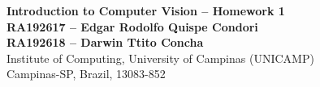 \documentclass[10pt, a4paper]{article}
\begin{document}
\begin{center}

\textbf{Introduction to Computer Vision -- Homework 1} \\[0.1cm]

\textbf{RA192617 -- Edgar Rodolfo Quispe Condori} \\[0.1cm]
\textbf{RA192618 -- Darwin Ttito Concha} \\[0.1cm]

Institute of Computing, University of Campinas (UNICAMP) \\
Campinas-SP, Brazil, 13083-852 \\
\end{center}






\end{document}
